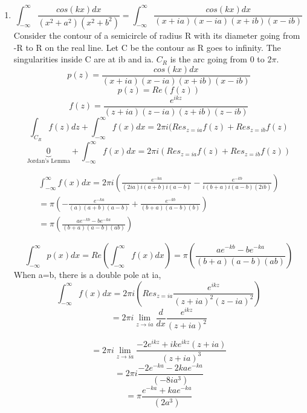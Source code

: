 \documentclass[a4paper]{article}
\begin{document}
\begin{enumerate}
\item	
\[ \int_{-\infty}^{\infty} \frac{cos(kx) dx}{(x^2+a^2)(x^2+b^2)}=\int_{-\infty}^{\infty} \frac{cos(kx) dx}{(x+ia)(x-ia)(x+ib)(x-ib)}\]  
Consider the contour of a semicircle of radius R with its diameter going from -R to R on the real line. Let C be the contour as R goes to infinity. The singularities inside C are at ib and ia. $C_R$ is the arc going from 0 to $2\pi$.
\[p(z)=\frac{cos(kx) dx}{(x+ia)(x-ia)(x+ib)(x-ib)}\]
\[p(z)= Re(f(z))\]
\[f(z)=\frac{e^{ikz}}{(z+ia)(z-ia)(z+ib)(z-ib)}\]
\[	  	\int_{C_R}f(z)dz+\int_{-\infty}^{\infty}f(x)dx= 2\pi i (Res_{z=ia}f(z) +Res_{z=ib}f(z)\]
\[	  \underbrace{0}_\text{Jordan's Lemma}+\int_{-\infty}^{\infty}f(x)dx= 2\pi i (Res_{z=ia}f(z) +Res_{z=ib}f(z))\]
		                         	\begin{center}       
		                         		\begin{gather*}
	\int_{-\infty}^{\infty}f(x)dx= 2\pi i (\frac{e^{-ka}}{(2ia)i(a+b)i(a-b)}- \frac{e^{-kb}}{i(b+a)i(a-b)(2ib)}) 
	\\= \pi  (-\frac{e^{-ka}}{(a)(a+b)(a-b)}+ \frac{e^{-kb}}{(b+a)(a-b)(b)})
		\\= \pi  ( \frac{ae^{-kb}-be^{-ka}}{(b+a)(a-b)(ab)})		
		                         		\end{gather*} 
		                         	\end{center}                       			\[\int_{-\infty}^{\infty}p(x)dx=Re\left(\int_{-\infty}^{\infty}f(x)dx\right)= \pi  ( \frac{ae^{-kb}-be^{-ka}}{(b+a)(a-b)(ab)})\]
	When a=b, there is a double pole at ia,
	\[	 \int_{-\infty}^{\infty}f(x)dx= 2\pi i (Res_{z=ia}\frac{e^{ikz}}{(z+ia)^2(z-ia)^2} )\]
\[=2	\pi i\lim_{z\to ia} \frac{d}{dx}\frac{e^{ikz}}{(z+ia)^2}\]
	                 
\[=2	\pi i\lim_{z\to ia} \frac{-2e^{ikz}+ike^{ikz}(z+ia)}{(z+ia)^3}\]		
\[=2	\pi i \frac{-2e^{-ka}-2kae^{-ka}}{(-8ia^3)}\]
\[=	\pi \frac{e^{-ka}+kae^{-ka}}{(2a^3)}\]
	\end{enumerate} 
\end{document}
